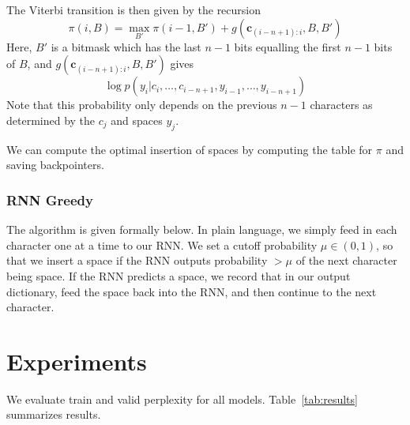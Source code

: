 \documentclass[11pt]{article}
\begin{document}
The Viterbi transition is then given by the recursion
$$\pi(i, B) = \max_{B'} \pi(i-1, B') + g(\mathbf{c}_{(i-n+1):i}, B, B')$$
Here, $B'$ is a bitmask which has the last $n-1$ bits equalling the first $n-1$ bits of $B$, and $g(\mathbf{c}_{(i-n+1):i}, B, B')$ gives
$$\log p(y_i | c_i, \ldots, c_{i-n+1}, y_{i-1}, \ldots, y_{i-n+1})$$
Note that this probability only depends on the previous $n-1$ characters as determined by the $c_j$ and spaces $y_j$.

We can compute the optimal insertion of spaces by computing the table for $\pi$ and saving backpointers.

\subsubsection{RNN Greedy}

The algorithm is given formally below. In plain language, we simply feed in each character one at a time to our RNN. We set a cutoff probability $\mu \in (0, 1)$, so that we insert a space if the RNN outputs probability $> \mu$ of the next character being space. If the RNN predicts a space, we record that in our output dictionary, feed the space back into the RNN, and then continue to the next character. 

\begin{algorithmic}
      \EndIf{}
      \EndIf{}
    \EndWhile{}
  \EndProcedure{}
\end{algorithmic}

\section{Experiments}

We evaluate train and valid perplexity for all models. Table~\ref{tab:results} summarizes results.
\end{document}
